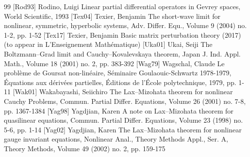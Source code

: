\begin{thebibliography}{99}
 [Rod93] Rodino, Luigi Linear partial differential operators in Gevrey spaces, World Scientific, 1993
 [Tex04] Texier, Benjamin The short-wave limit for nonlinear, symmetric, hyperbolic systems, Adv. Differ. Equ., Volume 9 (2004) no. 1-2, pp. 1-52
 [Tex17] Texier, Benjamin Basic matrix perturbation theory (2017) (to appear in L’Enseignement Mathématique)
 [Uka01] Ukai, Seiji The Boltzmann–Grad limit and Cauchy–Kovalevskaya theorem, Japan J. Ind. Appl. Math., Volume 18 (2001) no. 2, pp. 383-392
 [Wag79] Wagschal, Claude Le problème de Goursat non-linéaire, Séminaire Goulaouic-Schwartz 1978-1979, Équations aux dérivées partielles, Éditions de l’École polytechnique, 1979, pp. 1-11
 [Wak01] Wakabayashi, Seiichiro The Lax–Mizohata theorem for nonlinear Cauchy Problems, Commun. Partial Differ. Equations, Volume 26 (2001) no. 7-8, pp. 1367-1384
 [Yag98] Yagdjian, Karen A note on Lax–Mizohata theorem for quasilinear equations, Commun. Partial Differ. Equations, Volume 23 (1998) no. 5-6, pp. 1-14
 [Yag02] Yagdjian, Karen The Lax–Mizohata theorem for nonlinear gauge invariant equations, Nonlinear Anal., Theory Methods Appl., Ser. A, Theory Methods, Volume 49 (2002) no. 2, pp. 159-175
\end{thebibliography}
